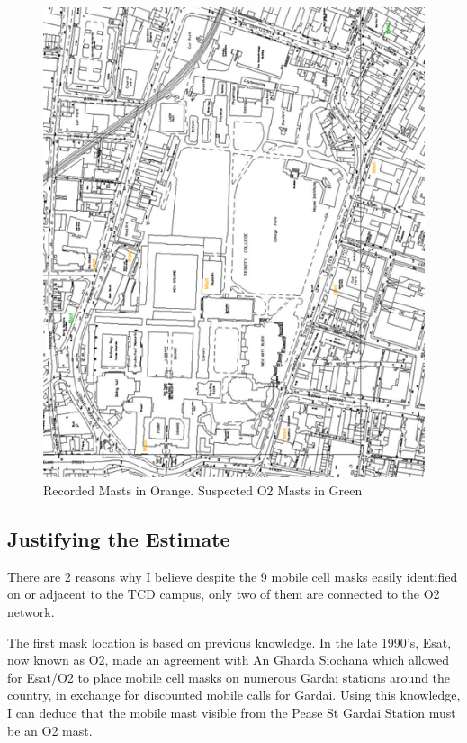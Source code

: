 \documentclass[a4paper,12pt]{article}
\begin{document}
\begin{figure}[h]

\includegraphics{tcd-masts.png}

\caption{Recorded Masts in Orange. Suspected O2 Masts in Green}

\end{figure}

\subsection{Justifying the Estimate}

There are 2 reasons why I believe despite the 9 mobile cell masks easily
identified on or adjacent to the TCD campus, only two of them are
connected to the O2 network.


The first mask location is based on previous knowledge. In the late 1990's,
Esat, now known as O2, made an agreement with An Gharda Siochana which
allowed for Esat/O2 to place mobile cell masks on numerous Gardai
stations around the country, in exchange for discounted mobile calls for
Gardai. Using this knowledge, I can deduce that the mobile mast visible
from the Pease St Gardai Station must be an O2 mast.
\end{document}
